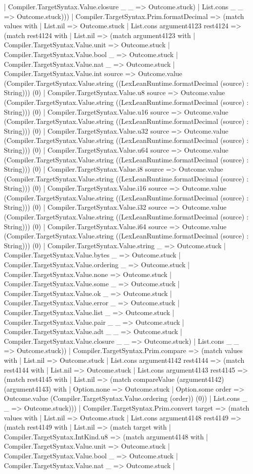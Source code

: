 \documentclass[11pt]{article}
\begin{document}
| Compiler.TargetSyntax.Value.closure \_ \_ => Outcome.stuck) | List.cons \_ \_ => Outcome.stuck))) | Compiler.TargetSyntax.Prim.formatDecimal => (match values with | List.nil => Outcome.stuck | List.cons argument4123 rest4124 => (match rest4124 with | List.nil => (match argument4123 with | Compiler.TargetSyntax.Value.unit => Outcome.stuck | Compiler.TargetSyntax.Value.bool \_ => Outcome.stuck | Compiler.TargetSyntax.Value.nat \_ => Outcome.stuck | Compiler.TargetSyntax.Value.int source => Outcome.value (Compiler.TargetSyntax.Value.string ((LexLeanRuntime.formatDecimal (source) : String))) (0) | Compiler.TargetSyntax.Value.u8 source => Outcome.value (Compiler.TargetSyntax.Value.string ((LexLeanRuntime.formatDecimal (source) : String))) (0) | Compiler.TargetSyntax.Value.u16 source => Outcome.value (Compiler.TargetSyntax.Value.string ((LexLeanRuntime.formatDecimal (source) : String))) (0) | Compiler.TargetSyntax.Value.u32 source => Outcome.value (Compiler.TargetSyntax.Value.string ((LexLeanRuntime.formatDecimal (source) : String))) (0) | Compiler.TargetSyntax.Value.u64 source => Outcome.value (Compiler.TargetSyntax.Value.string ((LexLeanRuntime.formatDecimal (source) : String))) (0) | Compiler.TargetSyntax.Value.i8 source => Outcome.value (Compiler.TargetSyntax.Value.string ((LexLeanRuntime.formatDecimal (source) : String))) (0) | Compiler.TargetSyntax.Value.i16 source => Outcome.value (Compiler.TargetSyntax.Value.string ((LexLeanRuntime.formatDecimal (source) : String))) (0) | Compiler.TargetSyntax.Value.i32 source => Outcome.value (Compiler.TargetSyntax.Value.string ((LexLeanRuntime.formatDecimal (source) : String))) (0) | Compiler.TargetSyntax.Value.i64 source => Outcome.value (Compiler.TargetSyntax.Value.string ((LexLeanRuntime.formatDecimal (source) : String))) (0) | Compiler.TargetSyntax.Value.string \_ => Outcome.stuck | Compiler.TargetSyntax.Value.bytes \_ => Outcome.stuck | Compiler.TargetSyntax.Value.ordering \_ => Outcome.stuck | Compiler.TargetSyntax.Value.none => Outcome.stuck | Compiler.TargetSyntax.Value.some \_ => Outcome.stuck | Compiler.TargetSyntax.Value.ok \_ => Outcome.stuck | Compiler.TargetSyntax.Value.error \_ => Outcome.stuck | Compiler.TargetSyntax.Value.list \_ => Outcome.stuck | Compiler.TargetSyntax.Value.pair \_ \_ => Outcome.stuck | Compiler.TargetSyntax.Value.adt \_ \_ => Outcome.stuck | Compiler.TargetSyntax.Value.closure \_ \_ => Outcome.stuck) | List.cons \_ \_ => Outcome.stuck)) | Compiler.TargetSyntax.Prim.compare => (match values with | List.nil => Outcome.stuck | List.cons argument4142 rest4144 => (match rest4144 with | List.nil => Outcome.stuck | List.cons argument4143 rest4145 => (match rest4145 with | List.nil => (match compareValue (argument4142) (argument4143) with | Option.none => Outcome.stuck | Option.some order => Outcome.value (Compiler.TargetSyntax.Value.ordering (order)) (0)) | List.cons \_ \_ => Outcome.stuck))) | Compiler.TargetSyntax.Prim.convert target => (match values with | List.nil => Outcome.stuck | List.cons argument4148 rest4149 => (match rest4149 with | List.nil => (match target with | Compiler.TargetSyntax.IntKind.u8 => (match argument4148 with | Compiler.TargetSyntax.Value.unit => Outcome.stuck | Compiler.TargetSyntax.Value.bool \_ => Outcome.stuck | Compiler.TargetSyntax.Value.nat \_ => Outcome.stuck | 
\end{document}
